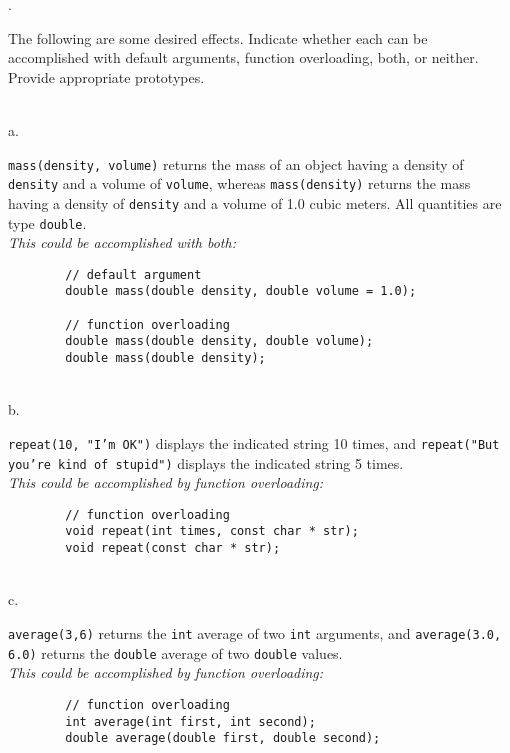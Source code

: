 \documentclass{amsart}
\begin{document}
\phantom{\quad} \vfill
{}. 
\begin{minipage}[t]{11.5 cm}
	The following are some desired effects. Indicate whether each can be accomplished with default arguments, function overloading, both, or neither. Provide appropriate prototypes.
\end{minipage} \\[1ex]
\phantom{1. }a.
\begin{minipage}[t]{11.5 cm}
	\texttt{mass(density, volume)} returns the mass of an object having a density of \texttt{density} and a volume of \texttt{volume}, whereas \texttt{mass(density)} returns the mass having a density of \texttt{density} and a volume of 1.0 cubic meters. All quantities are type \texttt{double}. \\[1ex]
	{\slshape This could be accomplished with both:}
	\begin{verbatim}
		// default argument
		double mass(double density, double volume = 1.0);

		// function overloading
		double mass(double density, double volume); 
		double mass(double density);
	\end{verbatim}
	{} %
\end{minipage} \\[3ex]
\phantom{1. }b.
\begin{minipage}[t]{11.5 cm}
	\texttt{repeat(10, "I'm OK")} displays the indicated string 10 times, and \texttt{repeat("But you're kind of stupid")} displays the indicated string 5 times. \\[1ex]
	{\slshape This could be accomplished by function overloading:}
	\begin{verbatim}
		// function overloading
		void repeat(int times, const char * str);
		void repeat(const char * str);
	\end{verbatim}
	{} %
\end{minipage} \\[3ex]
\phantom{1. }c.
\begin{minipage}[t]{11.5 cm}
	\texttt{average(3,6)} returns the \texttt{int} average of two \texttt{int} arguments, and \texttt{average(3.0, 6.0)} returns the \texttt{double} average of two \texttt{double} values. \\[1ex]
	{\slshape This could be accomplished by function overloading:}
	\begin{verbatim}
		// function overloading
		int average(int first, int second);
		double average(double first, double second);
	\end{verbatim}
	{} %
\end{minipage} \\[3ex]
\end{document}
